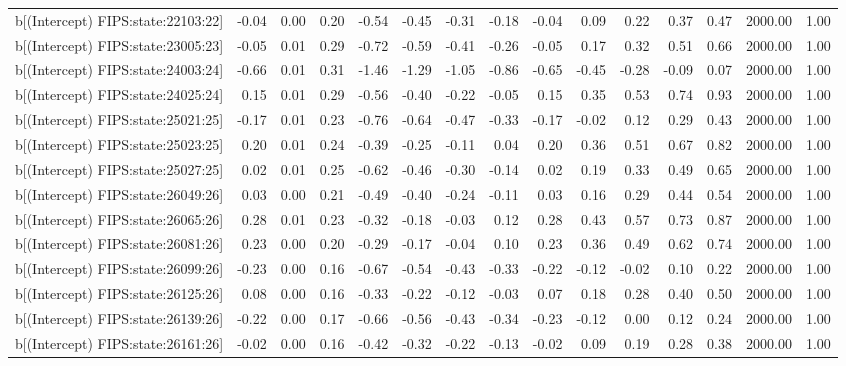 \begin{table}[ht]
\begin{tabular}{rrrrrrrrrrrrrrr}
  b[(Intercept) FIPS:state:22103:22] & -0.04 & 0.00 & 0.20 & -0.54 & -0.45 & -0.31 & -0.18 & -0.04 & 0.09 & 0.22 & 0.37 & 0.47 & 2000.00 & 1.00 \\ 
  b[(Intercept) FIPS:state:23005:23] & -0.05 & 0.01 & 0.29 & -0.72 & -0.59 & -0.41 & -0.26 & -0.05 & 0.17 & 0.32 & 0.51 & 0.66 & 2000.00 & 1.00 \\ 
  b[(Intercept) FIPS:state:24003:24] & -0.66 & 0.01 & 0.31 & -1.46 & -1.29 & -1.05 & -0.86 & -0.65 & -0.45 & -0.28 & -0.09 & 0.07 & 2000.00 & 1.00 \\ 
  b[(Intercept) FIPS:state:24025:24] & 0.15 & 0.01 & 0.29 & -0.56 & -0.40 & -0.22 & -0.05 & 0.15 & 0.35 & 0.53 & 0.74 & 0.93 & 2000.00 & 1.00 \\ 
  b[(Intercept) FIPS:state:25021:25] & -0.17 & 0.01 & 0.23 & -0.76 & -0.64 & -0.47 & -0.33 & -0.17 & -0.02 & 0.12 & 0.29 & 0.43 & 2000.00 & 1.00 \\ 
  b[(Intercept) FIPS:state:25023:25] & 0.20 & 0.01 & 0.24 & -0.39 & -0.25 & -0.11 & 0.04 & 0.20 & 0.36 & 0.51 & 0.67 & 0.82 & 2000.00 & 1.00 \\ 
  b[(Intercept) FIPS:state:25027:25] & 0.02 & 0.01 & 0.25 & -0.62 & -0.46 & -0.30 & -0.14 & 0.02 & 0.19 & 0.33 & 0.49 & 0.65 & 2000.00 & 1.00 \\ 
  b[(Intercept) FIPS:state:26049:26] & 0.03 & 0.00 & 0.21 & -0.49 & -0.40 & -0.24 & -0.11 & 0.03 & 0.16 & 0.29 & 0.44 & 0.54 & 2000.00 & 1.00 \\ 
  b[(Intercept) FIPS:state:26065:26] & 0.28 & 0.01 & 0.23 & -0.32 & -0.18 & -0.03 & 0.12 & 0.28 & 0.43 & 0.57 & 0.73 & 0.87 & 2000.00 & 1.00 \\ 
  b[(Intercept) FIPS:state:26081:26] & 0.23 & 0.00 & 0.20 & -0.29 & -0.17 & -0.04 & 0.10 & 0.23 & 0.36 & 0.49 & 0.62 & 0.74 & 2000.00 & 1.00 \\ 
  b[(Intercept) FIPS:state:26099:26] & -0.23 & 0.00 & 0.16 & -0.67 & -0.54 & -0.43 & -0.33 & -0.22 & -0.12 & -0.02 & 0.10 & 0.22 & 2000.00 & 1.00 \\ 
  b[(Intercept) FIPS:state:26125:26] & 0.08 & 0.00 & 0.16 & -0.33 & -0.22 & -0.12 & -0.03 & 0.07 & 0.18 & 0.28 & 0.40 & 0.50 & 2000.00 & 1.00 \\ 
  b[(Intercept) FIPS:state:26139:26] & -0.22 & 0.00 & 0.17 & -0.66 & -0.56 & -0.43 & -0.34 & -0.23 & -0.12 & 0.00 & 0.12 & 0.24 & 2000.00 & 1.00 \\ 
  b[(Intercept) FIPS:state:26161:26] & -0.02 & 0.00 & 0.16 & -0.42 & -0.32 & -0.22 & -0.13 & -0.02 & 0.09 & 0.19 & 0.28 & 0.38 & 2000.00 & 1.00 \\ 

\end{tabular}
\end{table}
